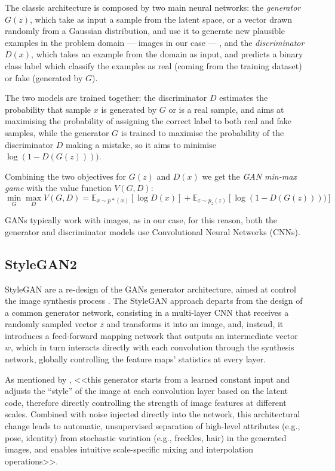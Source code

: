\documentclass{article}
\begin{document}
	The classic architecture is composed by two main neural networks: the \textit{generator} ${G(z)}$, 
	which take as input a sample from the latent space, or a vector drawn randomly from a 
	Gaussian distribution, and use it to generate new plausible examples in the problem domain — 
	images in our case — , and the \textit{discriminator} ${D(x)}$, which takes an example from the 
	domain as input, and predicts a binary class label which classify the examples as real (coming from 
	the training dataset) or fake (generated by $G$).
	
	The two models are trained together: the discriminator $D$ estimates the probability that 
	sample $x$ is generated by $G$ or is a real sample, and aims at maximising the probability of 
	assigning the correct label to both real and fake samples, while the generator $G$ is trained to 
	maximise the probability of the discriminator $D$ making a mistake, so it aims to minimise 
	$\log(1-D(G(z))))$.

	Combining the two objectives for $G(z)$ and $D(x)$ we get the \textit{GAN min-max game} with the 
	value function $V(G,D)$:
	\begin{equation}
	\label{e:minmaxgame}
	\min_G \max_D V(G,D) = 
	\mathbb{E}_{x \sim p*(x)} [\log D(x)] + \mathbb E _{z \sim p_z(z)} [\log (1-D(G(z))))]
	\end{equation}
	
	GANs typically work with images, as in our case, for this reason, both the generator and 
	discriminator models use Convolutional Neural Networks (CNNs).
	
	\subsection{StyleGAN2}\label{sec:stylegan}%
	StyleGAN are a re-design of the GANs generator architecture, aimed at control the image synthesis 
	process \cite{karras2019style}.
	The StyleGAN approach departs from the design of a common generator network, consisting in a 
	multi-layer CNN that receives a randomly sampled vector $z$ and transforms it into an image, and, 
	instead, it introduces a feed-forward mapping network that outputs an intermediate vector $w$, 
	which in turn interacts directly with each convolution through the synthesis network, globally 
	controlling the feature maps’ statistics at every layer.
	
	As mentioned by \citet{karras2020analyzing}, <<this generator starts from a learned constant 
	input and adjusts the ``style'' of the image at each convolution layer based on the latent code, 
	therefore directly controlling the strength of image features at different scales. 
	Combined with noise injected directly into the network, this architectural change leads to automatic, 
	unsupervised separation of high-level attributes (e.g., pose, identity) from stochastic variation (e.g., 
	freckles, hair) in the generated images, and enables intuitive scale-specific mixing and interpolation 
	operations>>.
	
\end{document}
